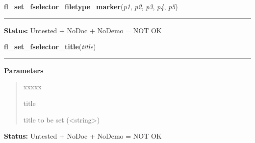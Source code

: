 \hspace{.8\funcindent}\begin{boxedminipage}{\funcwidth}

    \raggedright \textbf{fl\_set\_fselector\_filetype\_marker}(\textit{p1}, \textit{p2}, \textit{p3}, \textit{p4}, \textit{p5})

    \vspace{-1.5ex}

    \rule{\textwidth}{0.5\fboxrule}
\setlength{\parskip}{2ex}
\setlength{\parskip}{1ex}
\textbf{Status:} Untested + NoDoc + NoDemo = NOT OK



    \end{boxedminipage}

    \label{xformslib:library:fl_set_fselector_title}

    \vspace{0.5ex}

\hspace{.8\funcindent}\begin{boxedminipage}{\funcwidth}

    \raggedright \textbf{fl\_set\_fselector\_title}(\textit{title})

    \vspace{-1.5ex}

    \rule{\textwidth}{0.5\fboxrule}
\setlength{\parskip}{2ex}
\setlength{\parskip}{1ex}
      \textbf{Parameters}
      \vspace{-1ex}

      \begin{quote}
        \begin{Ventry}{xxxxx}

          \item[title]

          title to be set ({\textless}string{\textgreater})

        \end{Ventry}

      \end{quote}

\textbf{Status:} Untested + NoDoc + NoDemo = NOT OK



    \end{boxedminipage}

    \label{xformslib:library:fl_goodies_atclose}

